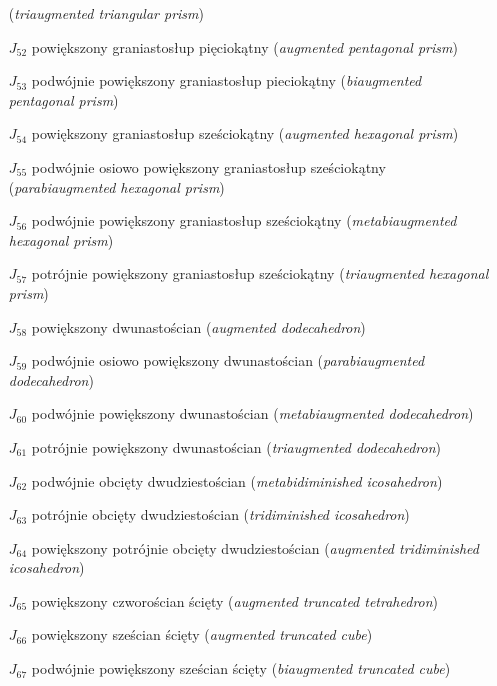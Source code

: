 \begin{itemize}
                     (\emph{triaugmented triangular prism})
    \item [$J_{52}$] {powiększony graniastosłup pięciokątny}
                     (\emph{augmented pentagonal prism})
    \item [$J_{53}$] {podwójnie powiększony graniastosłup pieciokątny}
                     (\emph{biaugmented pentagonal prism})
    \item [$J_{54}$] {powiększony graniastosłup sześciokątny}
                     (\emph{augmented hexagonal prism})
    \item [$J_{55}$] {podwójnie osiowo powiększony graniastosłup sześciokątny}
                     (\emph{parabiaugmented hexagonal prism})
    \item [$J_{56}$] {podwójnie powiększony graniastosłup sześciokątny}
                     (\emph{metabiaugmented hexagonal prism})
    \item [$J_{57}$] {potrójnie powiększony graniastosłup sześciokątny}
                     (\emph{triaugmented hexagonal prism})
    \item [$J_{58}$] {powiększony dwunastościan}
                     (\emph{augmented dodecahedron})
    \item [$J_{59}$] {podwójnie osiowo powiększony dwunastościan}
                     (\emph{parabiaugmented dodecahedron})
    \item [$J_{60}$] {podwójnie powiększony dwunastościan}
                     (\emph{metabiaugmented dodecahedron})
    \item [$J_{61}$] {potrójnie powiększony dwunastościan}
                     (\emph{triaugmented dodecahedron})
    \item [$J_{62}$] {podwójnie obcięty dwudziestościan}
                     (\emph{metabidiminished icosahedron})
    \item [$J_{63}$] {potrójnie obcięty dwudziestościan}
                     (\emph{tridiminished icosahedron})
    \item [$J_{64}$] {powiększony potrójnie obcięty dwudziestościan}
                     (\emph{augmented tridiminished icosahedron})
    \item [$J_{65}$] {powiększony czworościan ścięty}
                     (\emph{augmented truncated tetrahedron})
    \item [$J_{66}$] {powiększony sześcian ścięty}
                     (\emph{augmented truncated cube})
    \item [$J_{67}$] {podwójnie powiększony sześcian ścięty}
                     (\emph{biaugmented truncated cube})

\end{itemize}
